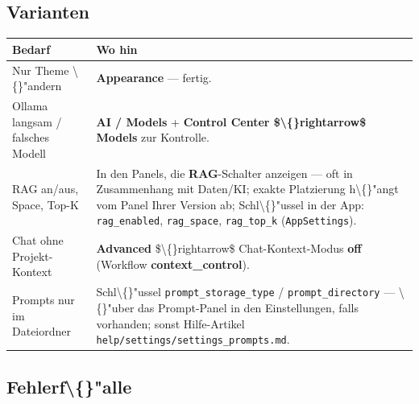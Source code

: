 \subsection{Varianten}

\begin{center}
\begin{tabular}{ll}
\hline
Bedarf & Wo hin \\
\hline
Nur Theme \textbackslash\{\}"andern & \textbf{Appearance} --- fertig. \\
Ollama langsam / falsches Modell & \textbf{AI / Models} + \textbf{Control Center \$\textbackslash\{\}rightarrow\$ Models} zur Kontrolle. \\
RAG an/aus, Space, Top-K & In den Panels, die \textbf{RAG}-Schalter anzeigen --- oft in Zusammenhang mit Daten/KI; exakte Platzierung h\textbackslash\{\}"angt vom Panel Ihrer Version ab; Schl\textbackslash\{\}"ussel in der App: \texttt{rag\_enabled}, \texttt{rag\_space}, \texttt{rag\_top\_k} (\texttt{AppSettings}). \\
Chat ohne Projekt-Kontext & \textbf{Advanced} \$\textbackslash\{\}rightarrow\$ Chat-Kontext-Modus \textbf{off} (Workflow \textbf{context\_control}). \\
Prompts nur im Dateiordner & Schl\textbackslash\{\}"ussel \texttt{prompt\_storage\_type} / \texttt{prompt\_directory} --- \textbackslash\{\}"uber das Prompt-Panel in den Einstellungen, falls vorhanden; sonst Hilfe-Artikel \texttt{help/settings/settings\_prompts.md}. \\
\hline
\end{tabular}
\end{center}

\subsection{Fehlerf\textbackslash\{\}"alle}

